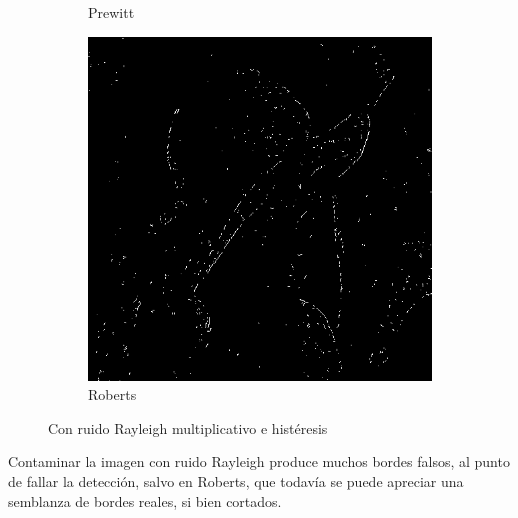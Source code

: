 \documentclass[a4paper]{article}
\begin{document}
\begin{figure}[H]
\begin{subfigure}[t]{0.3\textwidth}
	\caption{Prewitt}
	\end{subfigure}
	\begin{subfigure}[t]{0.3\textwidth}
	\centering
	\includegraphics[width=\textwidth]{imagenesInforme/lenaHysteresisRayleighRoberts}
	\caption{Roberts}
	\end{subfigure}
\caption{Con ruido Rayleigh multiplicativo e histéresis}
\end{figure}

Contaminar la imagen con ruido Rayleigh produce muchos bordes falsos, al punto de fallar la detección, salvo en Roberts, que todavía se puede apreciar una semblanza de bordes reales, si bien cortados.
\end{document}
